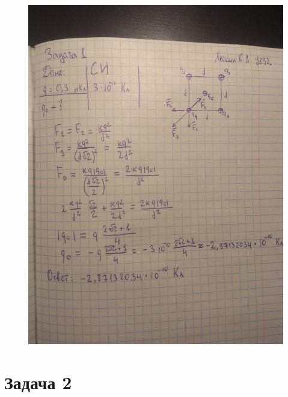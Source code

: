 \documentclass[12pt,a4paper]{article}  %
\begin{document}
	\begin{figure}[hpt!]
		\centering
		\includegraphics[width=1\linewidth]{photo/task1_solution}
	\end{figure}
	
	\section*{Задача 2}
	
\end{document}
